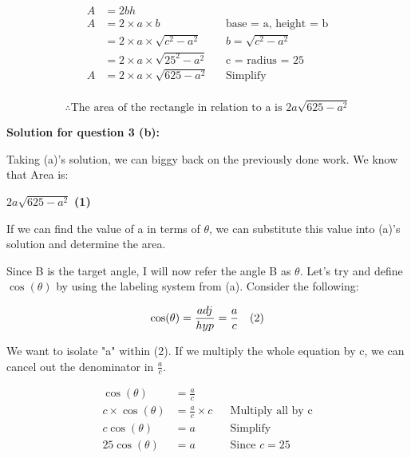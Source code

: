 \documentclass[12pt]{book}
\begin{document}
\begin{enumerate}
\begin{align*}
    A &= 2bh \\
    A &= 2\times a \times b && \text{base = a, height = b} \\
    &= 2\times a \times \sqrt{c^2 - a^2} && b = \sqrt{c^2 - a^2} \\
    &= 2\times a \times \sqrt{25^2 - a^2} && \text{c = radius = 25} \\
    A &= 2\times a \times \sqrt{625 - a^2} && \text{Simplify} \\
\end{align*}

\vspace{-1cm}
$$\boxed{\therefore \text{The area of the rectangle in relation to a is } 2a\sqrt{625 - a^2}}$$

\vspace{0.5cm}
\textbf{Solution for question 3 (b):}

\vspace{0.3cm}
Taking (a)'s solution, we can biggy back on the previously done work. We know that 
Area is:

\begin{center}
    $2a\sqrt{625 - a^2}$ \textbf{(1)} 
\end{center}

\vspace{0.2cm}
If we can find the value of a in terms of $\theta$, 
we can substitute this value into (a)'s solution and determine the area.

\vspace{0.3cm}
Since B is the target angle, I will now refer the angle B as $\theta$. 
Let's try and define $\cos(\theta)$ by using the labeling system from (a). 
Consider the following:

$$\cos(\theta) = \frac{adj}{hyp} = \frac{a}{c} \text{\space \space \space (2)}$$

We want to isolate "a" within (2). If we multiply the whole equation by c, we can 
cancel out the denominator in $\frac{a}{c}$.

\begin{align*}
    \cos(\theta) &= \frac{a}{c} \\
    c \times \cos(\theta) &= \frac{a}{c} \times c && \text{Multiply all by c}\\
    c\cos(\theta) &= a && \text{Simplify}\\
    25\cos(\theta) &= a && \text{Since } c = 25\\
\end{align*}


\end{enumerate}
\end{document}
